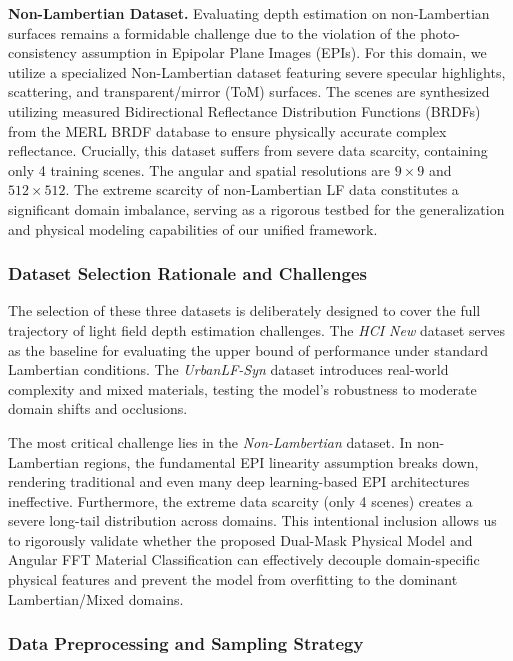 \documentclass[lettersize,journal]{IEEEtran}
\begin{document}
\textbf{Non-Lambertian Dataset.} Evaluating depth estimation on non-Lambertian surfaces remains a formidable challenge due to the violation of the photo-consistency assumption in Epipolar Plane Images (EPIs). For this domain, we utilize a specialized Non-Lambertian dataset featuring severe specular highlights, scattering, and transparent/mirror (ToM) surfaces. The scenes are synthesized utilizing measured Bidirectional Reflectance Distribution Functions (BRDFs) from the MERL BRDF database \cite{epistru} to ensure physically accurate complex reflectance. Crucially, this dataset suffers from severe data scarcity, containing only 4 training scenes. The angular and spatial resolutions are $9 \times 9$ and $512 \times 512$. The extreme scarcity of non-Lambertian LF data constitutes a significant domain imbalance, serving as a rigorous testbed for the generalization and physical modeling capabilities of our unified framework.

\subsubsection{Dataset Selection Rationale and Challenges}

The selection of these three datasets is deliberately designed to cover the full trajectory of light field depth estimation challenges. The \textit{HCI New} dataset serves as the baseline for evaluating the upper bound of performance under standard Lambertian conditions. The \textit{UrbanLF-Syn} dataset introduces real-world complexity and mixed materials, testing the model's robustness to moderate domain shifts and occlusions. 

The most critical challenge lies in the \textit{Non-Lambertian} dataset. In non-Lambertian regions, the fundamental EPI linearity assumption breaks down, rendering traditional and even many deep learning-based EPI architectures ineffective. Furthermore, the extreme data scarcity (only 4 scenes) creates a severe long-tail distribution across domains. This intentional inclusion allows us to rigorously validate whether the proposed Dual-Mask Physical Model and Angular FFT Material Classification can effectively decouple domain-specific physical features and prevent the model from overfitting to the dominant Lambertian/Mixed domains.

\subsubsection{Data Preprocessing and Sampling Strategy}
\end{document}
